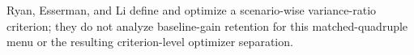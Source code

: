Ryan, Esserman, and Li define and optimize a scenario-wise variance-ratio criterion; they do not analyze baseline-gain retention for this matched-quadruple menu or the resulting criterion-level optimizer separation.
